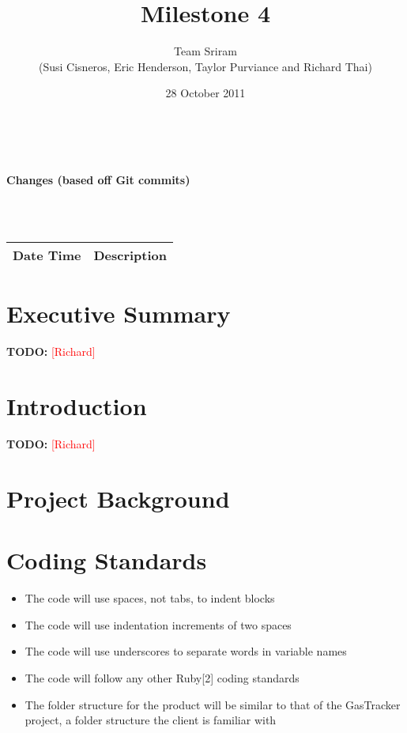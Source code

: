 \documentclass{article}
\newcommand{\richard}{\textcolor{red}{[Richard]}}
\begin{document}
\setlength{\voffset}{3.5in}
\title{Milestone 4}
\author{Team Sriram\\
(Susi Cisneros, Eric Henderson, Taylor Purviance and Richard Thai)}
\date{28 October 2011}
\maketitle
\clearpage
\setlength{\voffset}{0pt}
\tableofcontents
\clearpage
~\\
\begin{Large}\textbf{Changes (based off Git commits)}\end{Large}\\
~\\
\begin{tabular}{ | p{2in} | p{4.5in} | }
\hline
\textbf{Date Time} & \textbf{Description}\\
\hline
\hline
\end{tabular}
\clearpage
\section{Executive Summary}
\textbf{TODO:} \richard

\section{Introduction}
\textbf{TODO:} \richard

\section{Project Background}

\section{Coding Standards}
\begin{itemize}
\item The code will use spaces, not tabs, to indent blocks
\item The code will use indentation increments of two spaces
\item The code will use underscores to separate words in variable names
\item The code will follow any other Ruby[2] coding standards
\item The folder structure for the product will be similar to that of the GasTracker project, a folder structure the client is familiar with
\end{itemize}
\end{document}
